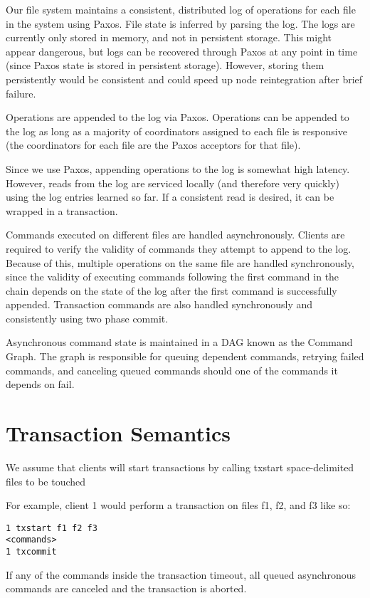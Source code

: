 \documentclass[11pt]{article}
\begin{document}
Our file system maintains a consistent, distributed log of operations for each file in the system using Paxos. File state is inferred by parsing the log.
The logs are currently only stored in memory, and not in persistent storage. This might appear dangerous, but logs can be recovered through Paxos at any point in time (since Paxos state is stored in persistent storage).  However, storing them persistently would be consistent and could speed up node reintegration after brief failure.

Operations are appended to the log via Paxos. Operations can be appended to the log as long as a majority of coordinators assigned to each file is responsive (the coordinators for each file are the Paxos acceptors for that file).

Since we use Paxos, appending operations to the log is somewhat high latency.
However, reads from the log are serviced locally (and therefore very quickly) using the log entries learned so far.
If a consistent read is desired, it can be wrapped in a transaction.

Commands executed on different files are handled asynchronously.
Clients are required to verify the validity of commands they attempt to append to the log. 
Because of this, multiple operations on the same file are handled synchronously, since the validity of executing commands
following the first command in the chain depends on the state of the log after the first command is successfully appended.
Transaction commands are also handled synchronously and consistently using two phase commit.

Asynchronous command state is maintained in a DAG known as the Command Graph.
The graph is responsible for queuing dependent commands, retrying failed commands, and canceling queued commands should one of the commands it depends on fail.

\section{Transaction Semantics}
We assume that clients will start transactions by calling txstart \<space-delimited files to be touched\>

For example, client 1 would perform a transaction on files f1, f2, and f3 like so:

\begin{verbatim}
1 txstart f1 f2 f3
<commands>
1 txcommit
\end{verbatim}

If any of the commands inside the transaction timeout, all queued asynchronous commands are canceled and the transaction is aborted.
\end{document}
